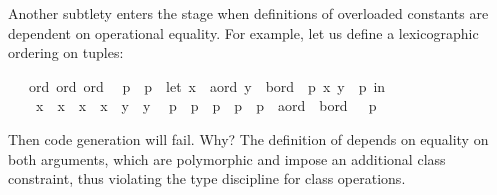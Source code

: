\begin{isabellebody}
\begin{isamarkuptext}
%
\end{isamarkuptext}%
\isamarkuptrue%
%
\isamarkuptrue%
%
\begin{isamarkuptext}%
Another subtlety
  enters the stage when definitions of overloaded constants
  are dependent on operational equality.  For example, let
  us define a lexicographic ordering on tuples: \\%
\end{isamarkuptext}%
\isamarkuptrue%
%
\isadelimML
%
\endisadelimML
%
\isatagML
%
\endisatagML
{\isafoldML}%
%
\isadelimML
%
\endisadelimML
\isanewline
{}\isamarkupfalse%
\ {\isacharasterisk}\ {\isacharcolon}{\isacharcolon}\ {\isacharparenleft}ord{\isacharcomma}\ ord{\isacharparenright}\ ord\isanewline
\ \ {\isachardoublequoteopen}p{}\ {\isacharless}\ p{}\ {\isasymequiv}\ let\ {\isacharparenleft}x{}\ {\isasymColon}\ {\isacharprime}a{\isasymColon}ord{\isacharcomma}\ y{}\ {\isasymColon}\ {\isacharprime}b{\isasymColon}ord{\isacharparenright}\ {\isacharequal}\ p{}{\isacharsemicolon}\ {\isacharparenleft}x{}{\isacharcomma}\ y{}{\isacharparenright}\ {\isacharequal}\ p{}\ in\isanewline
\ \ \ \ x{}\ {\isacharless}\ x{}\ {\isasymor}\ {\isacharparenleft}x{}\ {\isacharequal}\ x{}\ {\isasymand}\ y{}\ {\isacharless}\ y{}{\isacharparenright}{\isachardoublequoteclose}\isanewline
\ \ {\isachardoublequoteopen}p{}\ {\isasymle}\ p{}\ {\isasymequiv}\ p{}\ {\isacharless}\ p{}\ {\isasymor}\ {\isacharparenleft}p{}\ {\isasymColon}\ {\isacharprime}a{\isasymColon}ord\ {\isasymtimes}\ {\isacharprime}b{\isasymColon}ord{\isacharparenright}\ \ {\isacharequal}\ p{}{\isachardoublequoteclose}%
\isadelimproof
\ %
\endisadelimproof
%
\isatagproof
\isacommand{{\isachardot}{\isachardot}}\isamarkupfalse%
\isanewline
%
\endisatagproof
{\isafoldproof}%
%
\isadelimproof
%
\endisadelimproof
%
\isadelimML
%
\endisadelimML
%
\isatagML
%
\endisatagML
{\isafoldML}%
%
\isadelimML
%
\endisadelimML
%
\begin{isamarkuptext}%
Then code generation will fail.  Why?  The definition
  of  depends on equality on both arguments,
  which are polymorphic and impose an additional 
  class constraint, thus violating the type discipline
  for class operations.


\end{isamarkuptext}
\end{isabellebody}
